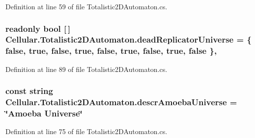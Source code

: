 Definition at line 59 of file Totalistic2\+D\+Automaton.\+cs.

\hypertarget{class_cellular_1_1_totalistic2_d_automaton_a195a2bf20843bbc0980979ef889170d3}{}
\subsubsection[{dead\+Replicator\+Universe}]{\setlength{\rightskip}{0pt plus 5cm}readonly bool \mbox{[}$\,$\mbox{]} Cellular.\+Totalistic2\+D\+Automaton.\+dead\+Replicator\+Universe = \{ false, true, false, true, false, true, false, true, false \}\hspace{0.3cm}{\ttfamily [static]}, {\ttfamily [protected]}}\label{class_cellular_1_1_totalistic2_d_automaton_a195a2bf20843bbc0980979ef889170d3}


Definition at line 89 of file Totalistic2\+D\+Automaton.\+cs.

\hypertarget{class_cellular_1_1_totalistic2_d_automaton_a0acaeddabe1e121966d99d9144eb3220}{}
\subsubsection[{descr\+Amoeba\+Universe}]{\setlength{\rightskip}{0pt plus 5cm}const string Cellular.\+Totalistic2\+D\+Automaton.\+descr\+Amoeba\+Universe = \char`\"{}Amoeba Universe\char`\"{}\hspace{0.3cm}{\ttfamily [protected]}}\label{class_cellular_1_1_totalistic2_d_automaton_a0acaeddabe1e121966d99d9144eb3220}


Definition at line 75 of file Totalistic2\+D\+Automaton.\+cs.

\hypertarget{class_cellular_1_1_totalistic2_d_automaton_a925e29c85ea53754a86864aa9b2e27f9}{}
